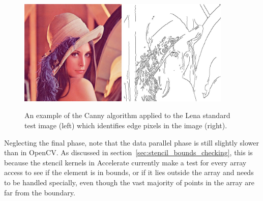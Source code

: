 \begin{figure}
    \begin{center}
        \includegraphics[width=0.45\textwidth]{images/sec-6/lena}
        \includegraphics[width=0.45\textwidth]{images/sec-6/lena-edges}
    \end{center}
    \caption[Example of the Canny edge detection algorithm]{An example of the
        Canny algorithm applied to the Lena standard test image (left) which
        identifies edge pixels in the image (right).}
    \label{fig:lena}
\end{figure}

Neglecting the final phase, note that the data parallel phase is still slightly
slower than in OpenCV. As discussed in
section~\ref{sec:stencil_bounds_checking}, this is because the stencil kernels
in Accelerate currently make a test for every array access to see if the element
is in bounds, or if it lies outside the array and needs to be handled specially,
even though the vast majority of points in the array are far from the boundary.

